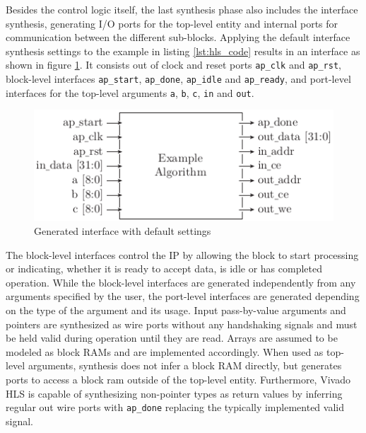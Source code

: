 Besides the control logic itself, the last synthesis phase also includes the
interface synthesis, generating I/O ports for the top-level entity and
internal ports for communication between the different sub-blocks. Applying
the default interface synthesis settings to the example in listing
\ref{lst:hls_code} results in an interface as shown in figure
\ref{fig:hls_if}. It consists out of clock and reset ports
\lstinline{ap_clk} and \lstinline{ap_rst}, block-level interfaces
\lstinline{ap_start}, \lstinline{ap_done}, \lstinline{ap_idle} and
\lstinline{ap_ready}, and port-level interfaces for the top-level arguments
\lstinline{a}, \lstinline{b}, \lstinline{c}, \lstinline{in} and
\lstinline{out}.
\begin{figure}[tb]
	\centering
	\includegraphics{../figures/hls_if}
	\caption{Generated interface with default settings}
	\label{fig:hls_if}
\end{figure}
The block-level interfaces control the \ac{IP} by allowing the block to start
processing or indicating, whether it is ready to accept data, is idle or has
completed operation. While the block-level interfaces are generated
independently from any arguments specified by the user, the port-level
interfaces are generated depending on the type of the argument and its usage.
Input pass-by-value arguments and pointers are synthesized as wire ports
without any handshaking signals and must be held valid during operation until
they are read. Arrays are assumed to be modeled as block \acp{RAM} and are
implemented accordingly. When used as top-level arguments, synthesis does not
infer a block \ac{RAM} directly, but generates ports to access a block ram
outside of the top-level entity. Furthermore, Vivado HLS is capable of
synthesizing non-pointer types as return values by inferring regular out wire
ports with \lstinline{ap_done} replacing the typically implemented valid
signal.


